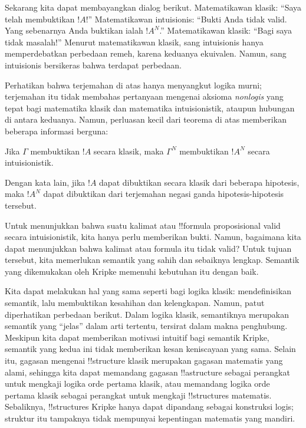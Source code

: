 \documentclass[../../../include/open-logic-section]{subfiles}
\begin{document}
Sekarang kita dapat membayangkan dialog berikut. Matematikawan klasik:
``Saya telah membuktikan $!A$!'' Matematikawan intuisionis: ``Bukti Anda tidak
valid. Yang sebenarnya Anda buktikan ialah $!A^N$.'' Matematikawan klasik:
``Bagi saya tidak masalah!'' Menurut matematikawan klasik, sang intuisionis
hanya memperdebatkan perbedaan remeh, karena keduanya ekuivalen. Namun, sang
intuisionis bersikeras bahwa terdapat perbedaan.

Perhatikan bahwa terjemahan di atas hanya menyangkut logika murni; terjemahan
itu tidak membahas pertanyaan mengenai aksioma \emph{nonlogis} yang tepat bagi
matematika klasik dan matematika intuisionistik, ataupun hubungan di antara
keduanya. Namun, perluasan kecil dari teorema di atas memberikan beberapa
informasi berguna:

\begin{thm}
Jika $\Gamma$ membuktikan $!A$ secara klasik, maka $\Gamma^N$ membuktikan
$!A^N$ secara intuisionistik.
\end{thm}

Dengan kata lain, jika $!A$ dapat dibuktikan secara klasik dari beberapa
hipotesis, maka $!A^N$ dapat dibuktikan dari terjemahan negasi ganda
hipotesis-hipotesis tersebut.

Untuk menunjukkan bahwa suatu kalimat atau !!{formula} proposisional valid
secara intuisionistik, kita hanya perlu memberikan bukti. Namun, bagaimana
kita dapat menunjukkan bahwa kalimat atau formula itu tidak valid? Untuk
tujuan tersebut, kita memerlukan semantik yang sahih dan sebaiknya lengkap.
Semantik yang dikemukakan oleh Kripke memenuhi kebutuhan itu dengan baik.

Kita dapat melakukan hal yang sama seperti bagi logika klasik: mendefinisikan
semantik, lalu membuktikan kesahihan dan kelengkapan. Namun, patut diperhatikan
perbedaan berikut. Dalam logika klasik, semantiknya merupakan semantik yang
``jelas'' dalam arti tertentu, tersirat dalam makna penghubung. Meskipun kita
dapat memberikan motivasi intuitif bagi semantik Kripke, semantik yang kedua
ini tidak memberikan kesan keniscayaan yang sama. Selain itu, gagasan mengenai
!!{structure} klasik merupakan gagasan matematis yang alami, sehingga kita
dapat memandang gagasan !!a{structure} sebagai perangkat untuk mengkaji logika
orde pertama klasik, atau memandang logika orde pertama klasik sebagai
perangkat untuk mengkaji !!{structure}s matematis. Sebaliknya, !!{structure}s
Kripke hanya dapat dipandang sebagai konstruksi logis; struktur itu tampaknya
tidak mempunyai kepentingan matematis yang mandiri.
\end{document}

